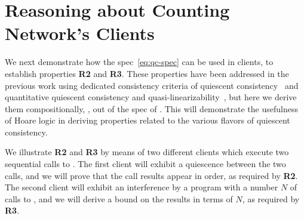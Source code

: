 
\section{Reasoning about Counting Network's Clients}
\label{sec:qclients}

We next demonstrate how the spec~\eqref{eq:qc-spec} can be used in
clients, to establish properties \textbf{R2} and \textbf{R3}. These
properties have been addressed in the previous work using dedicated
consistency criteria of quiescent
consistency~\cite{Aspnes-al:JACM94,Derrick-al:FM14} and quantitative
quiescent consistency and
quasi-linearizability~\cite{Afek-al:OPODIS10,Jagadeesan-Riely:ICALP14},
but here we derive them compositionally, \ie, out of the spec of
. This will demonstrate the usefulness of Hoare logic
in deriving properties related to the various flavors of quiescent
consistency.

We illustrate \textbf{R2} and \textbf{R3} by means of two different
clients which execute two sequential calls to . The
first client will exhibit a quiescence between the two calls, and we
will prove that the call results appear in order, as required by
\textbf{R2}. The second client will exhibit an interference by a
program with a number $N$ of calls to , and we will
derive a bound on the results in terms of $N$, as required by
\textbf{R3}.


